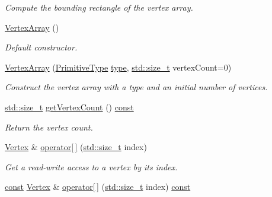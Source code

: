 \begin{DoxyCompactItemize}
\begin{DoxyCompactList}\small\item\em Compute the bounding rectangle of the vertex array. \end{DoxyCompactList}\item 
\hyperlink{classsf_1_1_vertex_array_a15729e01df8fc0021f9774dfb56295c1}{Vertex\-Array} ()
\begin{DoxyCompactList}\small\item\em Default constructor. \end{DoxyCompactList}\item 
\hyperlink{classsf_1_1_vertex_array_a4bb1c29a0e3354a035075899d84f02f9}{Vertex\-Array} (\hyperlink{group__graphics_ga5ee56ac1339984909610713096283b1b}{Primitive\-Type} \hyperlink{_entity_8cpp_aa209819775142a76b8e49319d79ecab2}{type}, \hyperlink{nc__alloc_8h_a7b60c5629e55e8ec87a4547dd4abced4}{std\-::size\-\_\-t} vertex\-Count=0)
\begin{DoxyCompactList}\small\item\em Construct the vertex array with a type and an initial number of vertices. \end{DoxyCompactList}\item 
\hyperlink{nc__alloc_8h_a7b60c5629e55e8ec87a4547dd4abced4}{std\-::size\-\_\-t} \hyperlink{classsf_1_1_vertex_array_afcf63214ffaf5903c818d7f2bf49970b}{get\-Vertex\-Count} () \hyperlink{term__entry_8h_a57bd63ce7f9a353488880e3de6692d5a}{const} 
\begin{DoxyCompactList}\small\item\em Return the vertex count. \end{DoxyCompactList}\item 
\hyperlink{classsf_1_1_vertex}{Vertex} \& \hyperlink{classsf_1_1_vertex_array_a6006676417d91f42d0278f1abcfe4352}{operator\mbox{[}$\,$\mbox{]}} (\hyperlink{nc__alloc_8h_a7b60c5629e55e8ec87a4547dd4abced4}{std\-::size\-\_\-t} index)
\begin{DoxyCompactList}\small\item\em Get a read-\/write access to a vertex by its index. \end{DoxyCompactList}\item 
\hyperlink{term__entry_8h_a57bd63ce7f9a353488880e3de6692d5a}{const} \hyperlink{classsf_1_1_vertex}{Vertex} \& \hyperlink{classsf_1_1_vertex_array_ab41c7768708eb55e8bb13eecce003cc4}{operator\mbox{[}$\,$\mbox{]}} (\hyperlink{nc__alloc_8h_a7b60c5629e55e8ec87a4547dd4abced4}{std\-::size\-\_\-t} index) \hyperlink{term__entry_8h_a57bd63ce7f9a353488880e3de6692d5a}{const} 

\end{DoxyCompactItemize}
